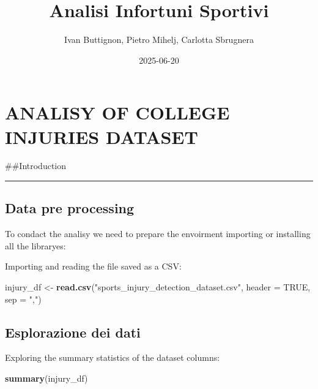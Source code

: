 \documentclass[
]{article}
\title{Analisi Infortuni Sportivi}
\author{Ivan Buttignon, Pietro Mihelj, Carlotta Sbrugnera}
\date{2025-06-20}
\newenvironment{Shaded}{\begin{snugshade}}{\end{snugshade}}
\newcommand{\AttributeTok}[1]{\textcolor[rgb]{0.13,0.29,0.53}{#1}}
\newcommand{\ConstantTok}[1]{\textcolor[rgb]{0.56,0.35,0.01}{#1}}
\newcommand{\FunctionTok}[1]{\textcolor[rgb]{0.13,0.29,0.53}{\textbf{#1}}}
\newcommand{\NormalTok}[1]{#1}
\newcommand{\OtherTok}[1]{\textcolor[rgb]{0.56,0.35,0.01}{#1}}
\newcommand{\StringTok}[1]{\textcolor[rgb]{0.31,0.60,0.02}{#1}}
\begin{document}
\maketitle

{
\setcounter{tocdepth}{3}
\tableofcontents
}
\newpage

\section{ANALISY OF COLLEGE INJURIES
DATASET}\label{analisy-of-college-injuries-dataset}

\#\#Introduction

\begin{center}\rule{0.5\linewidth}{0.5pt}\end{center}

\subsection{Data pre processing}\label{data-pre-processing}

To condact the analisy we need to prepare the envoirment importing or
installing all the libraryes:

Importing and reading the file saved as a CSV:

\begin{Shaded}
\begin{Highlighting}[]
\NormalTok{injury\_df }\OtherTok{\textless{}{-}} \FunctionTok{read.csv}\NormalTok{(}\StringTok{"sports\_injury\_detection\_dataset.csv"}\NormalTok{, }\AttributeTok{header =} \ConstantTok{TRUE}\NormalTok{, }\AttributeTok{sep =} \StringTok{","}\NormalTok{)}
\end{Highlighting}
\end{Shaded}

\subsection{Esplorazione dei dati}\label{esplorazione-dei-dati}

Exploring the summary statistics of the dataset columns:

\begin{Shaded}
\begin{Highlighting}[]
\FunctionTok{summary}\NormalTok{(injury\_df)}
\end{Highlighting}
\end{Shaded}
\end{document}
